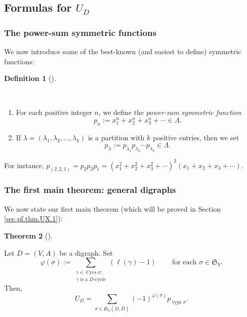\documentclass[numbers=enddot,12pt,final,onecolumn,notitlepage]{scrartcl}%
\numberwithin{exer}{section}
\theoremstyle{definition}
\newtheorem{theo}{Theorem}[section]
\newenvironment{theorem}[1][]
{\begin{theo}[#1]\begin{leftbar}}
{\end{leftbar}\end{theo}}
\newtheorem{defi}[theo]{Definition}
\newenvironment{definition}[1][]
{\begin{defi}[#1]\begin{leftbar}}
{\end{leftbar}\end{defi}}
\let\sumnonlimits\sum
\renewcommand{\sum}{\sumnonlimits\limits}
\begin{document}
\subsection{Formulas for $U_{D}$}

\subsubsection{The power-sum symmetric functions}

We now introduce some of the best-known (and easiest to define) symmetric functions:

\begin{definition}
\label{def.powersum}\ \ 

\begin{enumerate}
\item[\textbf{(a)}] For each positive integer $n$, we define the
\emph{power-sum symmetric function}
\[
p_{n}:=x_{1}^{n}+x_{2}^{n}+x_{3}^{n}+\cdots\in\Lambda.
\]


\item[\textbf{(b)}] If $\lambda=\left(  \lambda_{1},\lambda_{2},\ldots
,\lambda_{k}\right)  $ is a partition with $k$ positive entries, then we set%
\[
p_{\lambda}:=p_{\lambda_{1}}p_{\lambda_{2}}\cdots p_{\lambda_{k}}\in\Lambda.
\]

\end{enumerate}
\end{definition}

For instance, $p_{\left(  2,2,1\right)  }=p_{2}p_{2}p_{1}=\left(  x_{1}%
^{2}+x_{2}^{2}+x_{3}^{2}+\cdots\right)  ^{2}\left(  x_{1}+x_{2}+x_{3}%
+\cdots\right)  $.

\subsubsection{The first main theorem: general digraphs}

We now state our first main theorem (which will be proved in Section
\ref{sec.pf.thm.UX.1}):

\begin{theorem}
\label{thm.UX.1}Let $D=\left(  V,A\right)  $ be a digraph. Set%
\[
\varphi\left(  \sigma\right)  :=\sum_{\substack{\gamma\in\operatorname*{Cycs}%
\sigma;\\\gamma\text{ is a }D\text{-cycle}}}\left(  \ell\left(  \gamma\right)
-1\right)  \ \ \ \ \ \ \ \ \ \ \text{for each }\sigma\in\mathfrak{S}_{V}.
\]
Then,%
\[
U_{D}=\sum_{\sigma\in\mathfrak{S}_{V}\left(  D,\overline{D}\right)  }\left(
-1\right)  ^{\varphi\left(  \sigma\right)  }p_{\operatorname*{type}\sigma}.
\]

\end{theorem}
\end{document}
